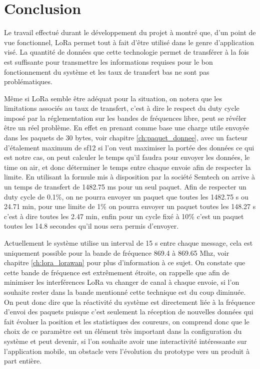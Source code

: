 
\chapter{Conclusion}

Le travail effectué durant le développement du projet à montré que, d'un point de vue fonctionnel, LoRa permet tout à fait d'être utilisé dans le genre d'application visé. La quantité de données que cette technologie permet de transférer à la fois est suffisante pour transmettre les informations requises pour le bon fonctionnement du système et les taux de transfert bas ne sont pas problématiques.

Même si LoRa semble être adéquat pour la situation, on notera que les limitations associés au taux de transfert, c'est à dire le respect du duty cycle imposé par la réglementation sur les bandes de fréquences libre, peut se révéler être un réel problème. En effet en prenant comme base une charge utile envoyée dans les paquets de 30 bytes, voir chapitre \ref{ch:paquet_donnee}, avec un facteur d'étalement maximum de sf12 si l'on veut maximiser la portée des données ce qui est notre cas, on peut calculer le temps qu'il faudra pour envoyer les données, le time on air, et donc déterminer le temps entre chaque envoie afin de respecter la limite. En utilisant la formule mis à disposition par la société Semtech on arrive à un temps de transfert de 1482.75 ms pour un seul paquet. Afin de respecter un duty cycle de 0.1\%, on ne pourra envoyer un paquet que toutes les 1482.75 s ou 24.71 min, pour une limite de 1\% on pourra envoyer un paquet toutes les 148.27 s c'est à dire toutes les 2.47 min, enfin pour un cycle fixé à 10\% c'est un paquet toutes les 14.8 secondes qu'il nous sera permis d'envoyer. \cite{lora_design_guide}

Actuellement le système utilise un interval de 15 s entre chaque message, cela est uniquement possible pour la bande de fréquence 869.4 à 869.65 Mhz, voir chapitre  \ref{ch:lora_lorawan} pour plus d'information à ce sujet. On constate que cette bande de fréquence est extrêmement étroite, on rappelle que afin de minimiser les interférences LoRa va changer de canal à chaque envoie, si l'on souhaite rester dans la bande mentionné cette technique est du coup diminuée. On peut donc dire que la réactivité du système est directement liée à la fréquence d'envoi des paquets puisque c'est seulement la réception de nouvelles données qui fait évoluer la position et les statistiques des coureurs, on comprend donc que le choix de ce paramètre est un élément très important dans la configuration du système et peut devenir, si l'on souhaite avoir une interactivité intéressante sur l'application mobile, un obstacle vers l'évolution du prototype vers un produit à part entière.

